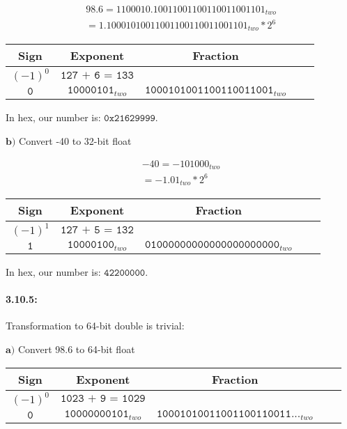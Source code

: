 \documentclass[a4paper]{article}
\begin{document}
\begin{align}
98.6 = 1100010.10011001100110011001101_{two} \\
= 1.10001010011001100110011001101_{two} * 2^6
\end{align}

\begin{center}
\begin{tabular}{|c|c|c|c|c|}
\hline
Sign & Exponent & Fraction\\
\hline
$(-1)^0$ & $\texttt{127 + 6 = 133}$ & $\texttt{}$ \\
\hline
$\texttt{0}$ & $\texttt{10000101}_{two}$ & $\texttt{1000101001100110011001}_{two}$ \\
\hline
\end{tabular}
\end{center}

In hex, our number is: $\texttt{0x21629999}$.

$\textbf{b)}$ Convert -40 to 32-bit float

\begin{align}
-40 = -101000_{two} \\
= -1.01_{two} * 2^6
\end{align}

\begin{center}
\begin{tabular}{|c|c|c|c|c|}
\hline
Sign & Exponent & Fraction\\
\hline
$(-1)^1$ & $\texttt{127 + 5 = 132}$ & $\texttt{}$ \\
\hline
$\texttt{1}$ & $\texttt{10000100}_{two}$ & $\texttt{01000000000000000000000}_{two}$ \\
\hline
\end{tabular}
\end{center}

In hex, our number is: $\texttt{42200000}$.


\paragraph*{3.10.5:} Transformation to 64-bit double is trivial:

$\textbf{a)}$  Convert 98.6 to 64-bit float

\begin{center}
\begin{tabular}{|c|c|c|c|c|}
\hline
Sign & Exponent & Fraction\\
\hline
$(-1)^0$ & $\texttt{1023 + 9 = 1029}$ & $\texttt{}$ \\
\hline
$\texttt{0}$ & $\texttt{10000000101}_{two}$ & $\texttt{10001010011001100110011...}_{two}$ \\
\hline
\end{tabular}
\end{center}
\end{document}
